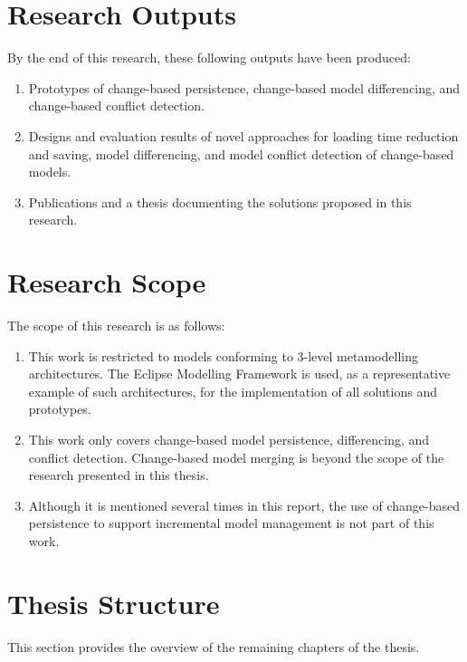 \section{Research Outputs}
\label{sec:research_outputs}
By the end of this research, these following outputs have been produced:
\begin{enumerate}
\item Prototypes of change-based persistence, change-based model differencing, and change-based conflict detection. 
\item Designs and evaluation results of novel approaches for loading time reduction and saving, model differencing, and model conflict detection of change-based models.
\item Publications \cite{DBLP:conf/models/YohannisKP17,yohannis2018towards,DBLP:conf/models/YohannisRPK18,yohannis2019efficient} and a thesis documenting the solutions proposed in this research.
\end{enumerate}

\section{Research Scope}
\label{sec:research_scope}
The scope of this research is as follows:
\begin{enumerate}
\item This work is restricted to models conforming to 3-level metamodelling architectures. The Eclipse Modelling Framework is used, as a representative example of such architectures, for the implementation of all solutions and prototypes.
\item This work only covers change-based model persistence, differencing, and conflict detection. Change-based model merging is beyond the scope of the research presented in this thesis.
\item Although it is mentioned several times in this report, the use of change-based persistence to support incremental model management is not part of this work. 
\end{enumerate}

\section{Thesis Structure}
\label{sec:Thesis Structure}
This section provides the overview of the remaining chapters of the thesis.


